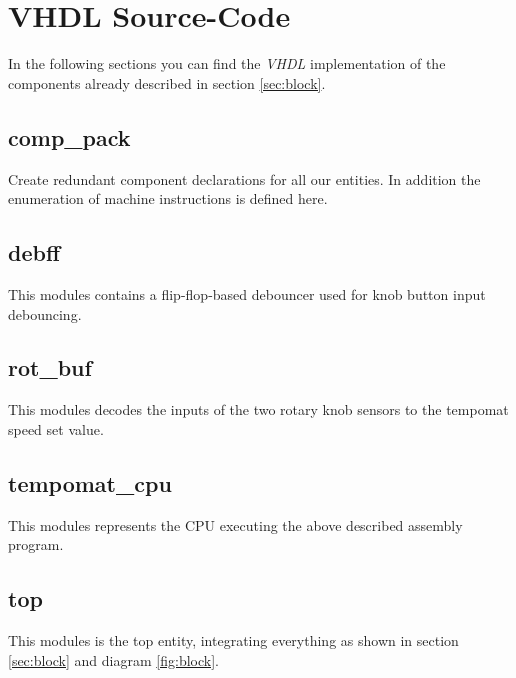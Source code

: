 \documentclass[a4paper,10pt]{scrartcl}
\begin{document}
\section{VHDL Source-Code}
\label{sec:vhdl}


In the following sections you can find the \emph{VHDL} implementation
of the components already described in section \ref{sec:block}.

\subsection{comp\_pack}
Create redundant component declarations for all our entities. In
addition the enumeration of machine instructions is defined here.



\subsection{debff}
This modules contains a flip-flop-based debouncer used for knob button input debouncing. 





\subsection{rot\_buf}
This modules decodes the inputs of the two rotary knob sensors to the tempomat speed set value. 





\subsection{tempomat\_cpu}
This modules represents the CPU executing the above described assembly program. 





\subsection{top}
This modules is the top entity, integrating everything as shown in section \ref{sec:block} and diagram \ref{fig:block}.
\end{document}
